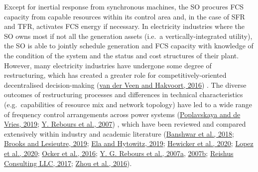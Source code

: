 \documentclass[12pt,a4paper,]{report}
\begin{document}
Except for inertial response from synchronous machines, the SO procures
FCS capacity from capable resources within its control area and, in the
case of SFR and TFR, activates FCS energy if necessary. In electricity
industries where the SO owns most if not all the generation assets
(i.e.~a vertically-integrated utility), the SO is able to jointly
schedule generation and FCS capacity with knowledge of the condition of
the system and the status and cost structures of their plant. However,
many electricity industries have undergone some degree of restructuring,
which has created a greater role for competitively-oriented
decentralised decision-making
(\protect\hyperlink{ref-vanderveenElectricityBalancingMarket2016}{van
der Veen and Hakvoort, 2016}) . The diverse outcomes of restructuring
processes and differences in technical characteristics
(e.g.~capabilities of resource mix and network topology) have led to a
wide range of frequency control arrangements across power systems
(\protect\hyperlink{ref-poplavskayaDistributedEnergyResources2019}{Poplavskaya
and de Vries, 2019};
\protect\hyperlink{ref-reboursFundamentalDesignIssues2007}{Y. Rebours et
al., 2007}) , which have been reviewed and compared extensively within
industry and academic literature
(\protect\hyperlink{ref-banshwarInternationalExperienceTechnical2018}{Banshwar
et al., 2018};
\protect\hyperlink{ref-brooksReviewFrequencyRegulation2019}{Brooks and
Lesieutre, 2019};
\protect\hyperlink{ref-elaAncillaryServicesUnited2019}{Ela and Hytowitz,
2019};
\protect\hyperlink{ref-hewickerDimensioningControlReserves2020}{Hewicker
et al., 2020};
\protect\hyperlink{ref-lopezSurveyAssessmentTechnical2020}{Lopez et al.,
2020}; \protect\hyperlink{ref-ockerDesignEuropeanBalancing2016}{Ocker et
al., 2016};
\protect\hyperlink{ref-reboursSurveyFrequencyVoltage2007a}{Y. G. Rebours
et al., 2007a},
\protect\hyperlink{ref-reboursSurveyFrequencyVoltage2007}{2007b};
\protect\hyperlink{ref-reishusconsultingllcElectricityAncillaryServices2017}{Reishus
Consulting LLC, 2017};
\protect\hyperlink{ref-zhouSurveyAncillaryServices2016}{Zhou et al.,
2016}).
\end{document}
